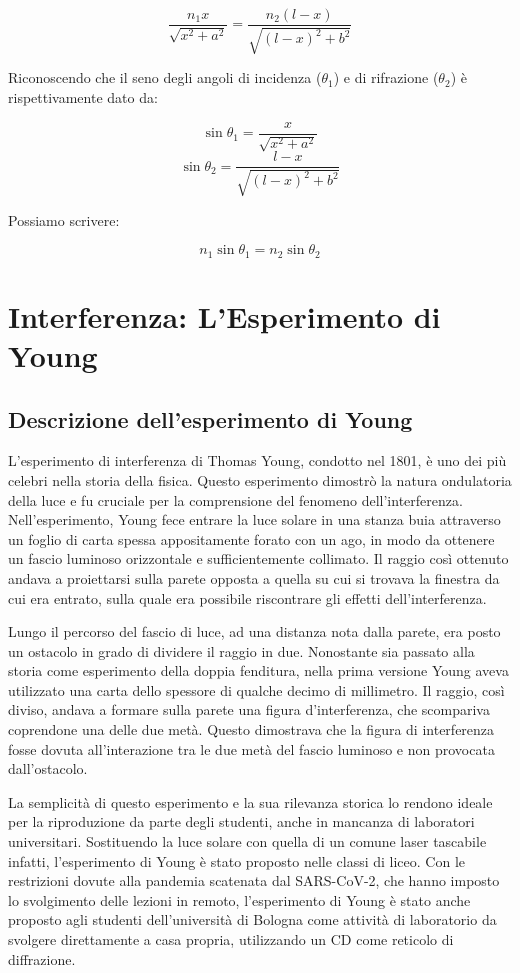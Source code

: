 \documentclass[12pt,a4paper]{report}
\begin{document}
\[ \frac{n_1 x}{\sqrt{x^2 + a^2}} = \frac{n_2 (l - x)}{\sqrt{(l - x)^2 + b^2}} \]

Riconoscendo che il seno degli angoli di incidenza (\( \theta_1 \)) e di rifrazione (\( \theta_2 \)) è rispettivamente dato da:

\[ \sin \theta_1 = \frac{x}{\sqrt{x^2 + a^2}} \]
\[ \sin \theta_2 = \frac{l - x}{\sqrt{(l - x)^2 + b^2}} \]

Possiamo scrivere:

\[ n_1 \sin \theta_1 = n_2 \sin \theta_2 \]

\section{Interferenza: L'Esperimento di Young}

\subsection{Descrizione dell'esperimento di Young}

L'esperimento di interferenza di Thomas Young, condotto nel 1801, è uno dei più celebri nella storia della fisica. Questo esperimento dimostrò la natura ondulatoria della luce e fu cruciale per la comprensione del fenomeno dell'interferenza. Nell'esperimento, Young fece entrare la luce solare in una stanza buia attraverso un foglio di carta spessa appositamente forato con un ago, in modo da ottenere un fascio luminoso orizzontale e sufficientemente collimato. Il raggio così ottenuto andava a proiettarsi sulla parete opposta a quella su cui si trovava la finestra da cui era entrato, sulla quale era possibile riscontrare gli effetti dell'interferenza.

Lungo il percorso del fascio di luce, ad una distanza nota dalla parete, era posto un ostacolo in grado di dividere il raggio in due. Nonostante sia passato alla storia come esperimento della doppia fenditura, nella prima versione Young aveva utilizzato una carta dello spessore di qualche decimo di millimetro. Il raggio, così diviso, andava a formare sulla parete una figura d'interferenza, che scompariva coprendone una delle due metà. Questo dimostrava che la figura di interferenza fosse dovuta all'interazione tra le due metà del fascio luminoso e non provocata dall'ostacolo.

La semplicità di questo esperimento e la sua rilevanza storica lo rendono ideale per la riproduzione da parte degli studenti, anche in mancanza di laboratori universitari. Sostituendo la luce solare con quella di un comune laser tascabile infatti, l'esperimento di Young è stato proposto nelle classi di liceo\cite{Scheider1986}. Con le restrizioni dovute alla pandemia scatenata dal SARS-CoV-2, che hanno imposto lo svolgimento delle lezioni in remoto, l'esperimento di Young è stato anche proposto agli studenti dell'università di Bologna come attività di laboratorio da svolgere direttamente a casa propria, utilizzando un CD come reticolo di diffrazione\cite{Campari2021}. 
\end{document}
